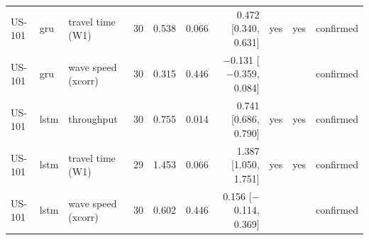 \begin{table}[htbp]
{\begin{tabular}{lllrrrrlll}
US-101 & gru & travel time (W1) & 30 & 0.538 & 0.066 & 0.472 [0.340, 0.631] & yes & yes & confirmed \\
US-101 & gru & wave speed (xcorr) & 30 & 0.315 & 0.446 & $-$0.131 [$-$0.359, 0.084] &  &  & confirmed \\
US-101 & lstm & throughput & 30 & 0.755 & 0.014 & 0.741 [0.686, 0.790] & yes & yes & confirmed \\
US-101 & lstm & travel time (W1) & 29 & 1.453 & 0.066 & 1.387 [1.050, 1.751] & yes & yes & confirmed \\
US-101 & lstm & wave speed (xcorr) & 30 & 0.602 & 0.446 & 0.156 [$-$0.114, 0.369] &  &  & confirmed \\
\bottomrule
\end{tabular}
}
\end{table}
